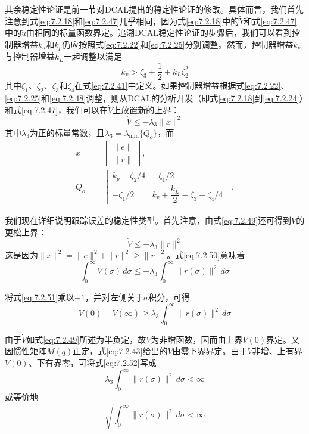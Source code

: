 \documentclass[UTF8]{ctexart}
\begin{document}
其余稳定性论证是前一节对DCAL提出的稳定性论证的修改。具体而言，我们首先注意到式\eqref{eq:7.2.18}和\eqref{eq:7.2.47}几乎相同，因为式\eqref{eq:7.2.18}中的$\tilde{Y}$和式\eqref{eq:7.2.47}中的$\tilde{u}$由相同的标量函数界定。追溯DCAL稳定性论证的步骤后，我们可以看到控制器增益$k_a$和$k_p$仍应按照式\eqref{eq:7.2.22}和\eqref{eq:7.2.25}分别调整。然而，控制器增益$k_v$与控制器增益$k_L$一起调整以满足
\begin{equation}\label{eq:7.2.48}
k_v > \zeta_3 + \frac{1}{2} + k_L\zeta_2^2
\end{equation}
其中$\zeta_1$、$\zeta_2$、$\zeta_3$和$\zeta_4$在式\eqref{eq:7.2.41}中定义。如果控制器增益根据式\eqref{eq:7.2.22}、\eqref{eq:7.2.25}和\eqref{eq:7.2.48}调整，则从DCAL的分析开发（即式\eqref{eq:7.2.18}到\eqref{eq:7.2.24}）和式\eqref{eq:7.2.47}，我们可以在$\dot{V}$上放置新的上界：
\begin{equation}\label{eq:7.2.49}
\dot{V} \leq -\lambda_3 \|x\|^2
\end{equation}
其中$\lambda_3$为正的标量常数，且$\lambda_3=\lambda_{\min}\{Q_o\}$，而
\begin{align*}
x &= \begin{bmatrix} \|e\| \\ \|r\| \end{bmatrix}, \\
Q_o &= \begin{bmatrix} k_p - \zeta_2/4 & -\zeta_1/2 \\ -\zeta_1/2 & k_v + \dfrac{k_L}{2} - \zeta_3 - \zeta_4/4 \end{bmatrix}.
\end{align*}

我们现在详细说明跟踪误差的稳定性类型。首先注意，由式\eqref{eq:7.2.49}还可得到$\dot{V}$的更松上界：
\begin{equation}\label{eq:7.2.50}
\dot{V} \leq -\lambda_3 \|r\|^2
\end{equation}
这是因为$\|x\|^2=\|e\|^2+\|r\|^2\geq \|r\|^2$。式\eqref{eq:7.2.50}意味着
\begin{equation}\label{eq:7.2.51}
\int_0^{\infty} \dot{V}(\sigma)\,d\sigma \leq -\lambda_3 \int_0^{\infty} \|r(\sigma)\|^2\,d\sigma
\end{equation}

将式\eqref{eq:7.2.51}乘以$-1$，并对左侧关于$\sigma$积分，可得
\begin{equation}\label{eq:7.2.52}
V(0) - V(\infty) \geq \lambda_3 \int_0^{\infty} \|r(\sigma)\|^2\,d\sigma
\end{equation}

由于$\dot{V}$如式\eqref{eq:7.2.49}所述为半负定，故$V$为非增函数，因而由上界$V(0)$界定。又因惯性矩阵$M(q)$正定，式\eqref{eq:7.2.43}给出的$V$由零下界界定。由于$V$非增、上有界$V(0)$、下有界零，可将式\eqref{eq:7.2.52}写成
\begin{equation}\label{eq:7.2.53}
\lambda_3 \int_0^{\infty} \|r(\sigma)\|^2\,d\sigma < \infty
\end{equation}
或等价地
\begin{equation}\label{eq:7.2.54}
\sqrt{\int_0^{\infty} \|r(\sigma)\|^2\,d\sigma} < \infty
\end{equation}
\end{document}
